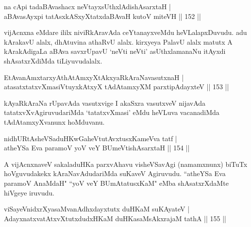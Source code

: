 \begin{shl}
na cApi tadaBAvashacx neVtayxsUthxlAdishAsarxtaH |\\
aBAvasAyxpi tatAsxkASxyXtatxdaBAvaH kutoV miteVH \hfill || 152 ||
\end{shl}

\begin{artha}
vijAcnxna eMdare ililx niviRkAravAda ceYtanayxveMdu heVLalapxDuvudu. adu kArakavU alalx, dhAtuvina athaRvU alalx. kirxyeya PalavU alalx matutx A kArakAdigaLa aBAva savxrUpavU `neVti neVti' asUthxlamanaNu itAyxdi shAsatxrXdiMda tiLiyuvudalalx.
\end{artha}


\begin{shl}
EtAvanAmxtarxyAthAtAmxyXtAkxyaRkAraNavasutxnaH |\\
atasatxtatxvXmasiVtuyxkAtxyX tAdAtamxyXM parxtipAdayxteV \hfill || 153 ||
\end{shl}

\begin{artha}
kAyaRkAraNa rUpavAda vasutxvige I akaSxra vasutxveV nijavAda tatatxvXvAgiruvudariMda `tatatxvXmasi' eMdu heVLuva vacanadiMda tAdAtamxyXvanunx hoMduvanu.
\end{artha}


\begin{shl}
nidhURtAsheVSaduHKwGaheVtutAvxtusxKameVva tatf |\\
atheYSa Eva paramoV yoV veY BUmeVtishAsarxtaH \hfill || 154 ||
\end{shl}

\begin{artha}
A vijAcnxnaveV sakaladuHKa parxvAhavu visheVSavAgi (namamxnunx) biTuTx hoVguvudakekx kAraNavAdudariMda suKaveV Agiruvudu. ``atheYSa Eva paramoV AnaMdaH" ``yoV veY BUmAtatusxKaM" eMba shAsatxrXdaMte hiVgeye iruvudu.
\end{artha}

\begin{shl}
viSayeVnidxrXyasaMvanAdhxdayxtutx duHKaM suKAyateV |\\
AdayxnatxvatAtxvXtutxdudxHKaM \footnotemark[1]{}duHKasaMsAkxrajaM tathA \hfill || 155 ||
\end{shl}

